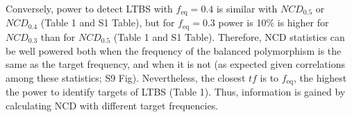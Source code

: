 \begin{refsection}
\begin{otherlanguage}{english}
Conversely, power to detect LTBS with $f_{\mathrm{eq}}=0.4$ is similar with $NCD_{0.5}$ or $NCD_{0.4}$ (Table 1 and S1 Table), but for $f_{\mathrm{eq}}=0.3$ power is 10\% is higher for $NCD_{0.3}$ than for $NCD_{0.5}$ (Table 1 and S1 Table). Therefore, NCD statistics can be well powered both when the frequency of the balanced polymorphism is the same as the target frequency, and when it is not (as expected given correlations among these statistics; S9 Fig). Nevertheless, the closest $tf$ is to $f_{\mathrm{eq}}$, the highest the power to identify targets of LTBS (Table 1). Thus, information is gained by calculating NCD with different target frequencies. 




\end{otherlanguage}
\end{refsection}
